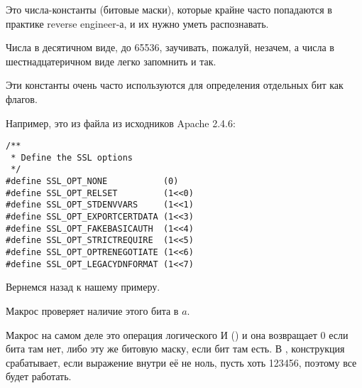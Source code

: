 Это числа-константы (битовые маски), которые крайне часто попадаются в практике reverse engineer-а, 
и их нужно уметь распознавать.

Числа в десятичном виде, до 65536, заучивать, пожалуй, незачем, а числа в шестнадцатеричном
виде легко запомнить и так.

Эти константы очень часто используются для определения отдельных бит как флагов.

Например, это из файла  из исходников Apache 2.4.6:

\begin{lstlisting}
/**
 * Define the SSL options
 */
#define SSL_OPT_NONE           (0)
#define SSL_OPT_RELSET         (1<<0)
#define SSL_OPT_STDENVVARS     (1<<1)
#define SSL_OPT_EXPORTCERTDATA (1<<3)
#define SSL_OPT_FAKEBASICAUTH  (1<<4)
#define SSL_OPT_STRICTREQUIRE  (1<<5)
#define SSL_OPT_OPTRENEGOTIATE (1<<6)
#define SSL_OPT_LEGACYDNFORMAT (1<<7)
\end{lstlisting}

Вернемся назад к нашему примеру.

Макрос  проверяет наличие этого бита в $a$.

Макрос  на самом деле это операция логического И () 
и она возвращает 0 если бита там нет, 
либо эту же битовую маску, если бит там есть. 
В \CCpp, конструкция  срабатывает, если выражение внутри её не ноль, пусть хоть 123456, 
поэтому все будет работать.







